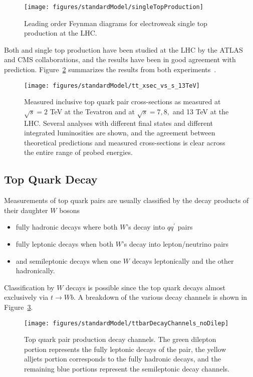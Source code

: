 \begin{figure}[h!]
\centering
\label{fig:singleTopProduction}
\texttt{[image: figures/standardModel/singleTopProduction]}
\caption{Leading order Feynman diagrams for electroweak single top production at the LHC.}
\end{figure}

Both \ttbar and single top production have been studied at the LHC by the ATLAS and CMS collaborations, and the results have been in good agreement with prediction. Figure~\ref{fig:LHCtopXsecMeasurements} summarizes the results from both experiments~\cite{Owen:2202214}.

\begin{figure}[h!]
\centering
\label{fig:LHCtopXsecMeasurements}
\texttt{[image: figures/standardModel/tt\_xsec\_vs\_s\_13TeV]}
\caption{Measured inclusive top quark pair cross-sections as measured at $\sqrt{s}=2$ TeV at the Tevatron and at $\sqrt{s}=7, 8,$ and 13 TeV at the LHC. Several analyses with different final states and different integrated luminosities are shown, and the agreement between theoretical predictions and measured cross-sections is clear across the entire range of probed energies.}
\end{figure}

\subsection{Top Quark Decay}
Measurements of top quark pairs are usually classified by the decay products of their daughter $W$ bosons
\begin{itemize}
\item fully hadronic decays where both $W$'s decay into $qq^{'}$ pairs
\item fully leptonic decays when both $W$'s decay into lepton/neutrino pairs
\item and semileptonic decays when one $W$ decays leptonically and the other hadronically. 
\end{itemize}
Classification by $W$ decays is possible since the top quark decays almost exclusively via $t\rightarrow Wb$. %
A breakdown of the various decay channels is shown in Figure~\ref{fig:ttbarDecayChannels}. 

\begin{figure}[h!]
\centering
\label{fig:ttbarDecayChannels}
\texttt{[image: figures/standardModel/ttbarDecayChannels\_noDilep]}
\caption{Top quark pair production decay channels. The green dilepton portion represents the fully leptonic decays of the \ttbar pair, the yellow alljets portion corresponds to the fully hadronic decays, and the remaining blue portions represent the semileptonic decay channels.}
\end{figure}

